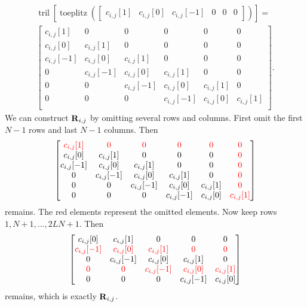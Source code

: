 \documentclass[a4paper, openany, oneside]{memoir}
\begin{document}
\begin{align*}
    \operatorname{tril}\left[\operatorname{toeplitz}\left(\begin{bmatrix}
        c_{i,j}[1] & c_{i,j}[0] & c_{i,j}[-1] & 0 & 0 & 0
    \end{bmatrix}\right)\right] = \\ \begin{bmatrix}
        c_{i,j}[1] & 0 & 0 & 0 & 0 & 0\\
        c_{i,j}[0] & c_{i,j}[1] & 0 & 0 & 0 & 0\\
        c_{i,j}[-1] & c_{i,j}[0] & c_{i,j}[1] & 0 & 0 & 0\\
        0 & c_{i,j}[-1] & c_{i,j}[0] & c_{i,j}[1] & 0 & 0\\
        0 & 0 & c_{i,j}[-1] & c_{i,j}[0] & c_{i,j}[1] & 0 \\
        0 & 0 & 0 & c_{i,j}[-1] & c_{i,j}[0] & c_{i,j}[1] \\
    \end{bmatrix}.
\end{align*}
We can construct $\boldsymbol{\mathbf{R}}_{i,j}$ by omitting several rows and columns. First omit the first $N-1$ rows and last $N-1$ columns. Then
\begin{align*}
    \begin{bmatrix}
        \color{red}c_{i,j}[1] & \color{red}0 & \color{red}0 & \color{red}0 & \color{red}0 & \color{red}0\\
        c_{i,j}[0] & c_{i,j}[1] & 0 & 0 & 0 & \color{red}0\\
        c_{i,j}[-1] & c_{i,j}[0] & c_{i,j}[1] & 0 & 0 & \color{red}0\\
        0 & c_{i,j}[-1] & c_{i,j}[0] & c_{i,j}[1] & 0 & \color{red}0\\
        0 & 0 & c_{i,j}[-1] & c_{i,j}[0] & c_{i,j}[1] & \color{red}0 \\
        0 & 0 & 0 & c_{i,j}[-1] & c_{i,j}[0] & \color{red}c_{i,j}[1] \\
   \end{bmatrix}   
\end{align*}
remains. The red elements represent the omitted elements. Now keep rows $1,N+1,\ldots,2LN+1$. Then
\begin{align*}
    \begin{bmatrix}
        c_{i,j}[0] & c_{i,j}[1] & 0 & 0 & 0\\
        \color{red}c_{i,j}[-1] & \color{red}c_{i,j}[0] & \color{red}c_{i,j}[1] & \color{red}0 & \color{red}0\\
        0 & c_{i,j}[-1] & c_{i,j}[0] & c_{i,j}[1] & 0\\
        \color{red}0 & \color{red}0 & \color{red}c_{i,j}[-1] & \color{red}c_{i,j}[0] & \color{red}c_{i,j}[1] \\
        0 & 0 & 0 & c_{i,j}[-1] & c_{i,j}[0]\\
   \end{bmatrix}
\end{align*}
remains, which is exactly $\boldsymbol{\mathbf{R}}_{i,j}$.
\end{document}
